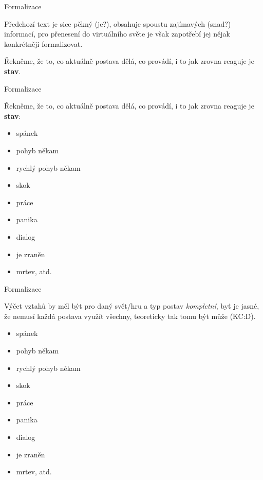 ﻿\documentclass[a4paper]{beamer}
\begin{document}
\begin{frame}{Formalizace}
    
    Předchozí text je sice pěkný (je?), obsahuje spoustu zajímavých (snad?) informací, pro přenesení do virtuálního světe je však zapotřebí jej nějak konkrétněji formalizovat. 
    
    \vfill
    
    Řekněme, že to, co aktuálně postava dělá, co provádí, i to jak zrovna reaguje je \textbf{stav}. 
    
\end{frame}

\begin{frame}{Formalizace}
    
    
    \vfill
    Řekněme, že to, co aktuálně postava dělá, co provádí, i to jak zrovna reaguje je \textbf{stav}: 

\vfill

\begin{itemize}
    \item spánek
    \item pohyb někam
    \item rychlý pohyb někam
    \item skok
    \item práce
    \item panika
    \item dialog
    \item je zraněn
    \item mrtev, atd.

\end{itemize}
\end{frame}

\begin{frame}{Formalizace}
    
    


    Výčet vztahů by měl být pro daný svět/hru a typ postav \emph{kompletní}, byť je jasné, že nemusí každá postava využít všechny, teoreticky tak tomu být může (KC:D).
\vfill

\begin{itemize}
    \item spánek
    \item pohyb někam
    \item rychlý pohyb někam
    \item skok
    \item práce
    \item panika
    \item dialog
    \item je zraněn
    \item mrtev, atd.
\end{itemize}
\end{frame}
\end{document}
